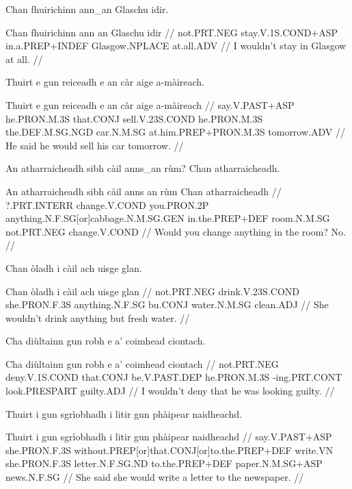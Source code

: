 \documentclass[a4paper,10pt]{article}
\begin{document}
\ex
\begingl
\glpre Chan fhuirichinn ann\_an Glaschu idir. 

\vspace{4mm}
\gla Chan fhuirichinn {ann an} Glaschu idir  //
\glb not.PRT.NEG stay.V.1S.COND+ASP in.a.PREP+INDEF Glasgow.NPLACE at.all.ADV  //
\glft I wouldn't stay in Glasgow at all. //
\endgl
\xe

\ex
\begingl
\glpre Thuirt e gun reiceadh e an càr aige a-màireach. 

\vspace{4mm}
\gla Thuirt e gun reiceadh e an càr aige a-màireach  //
\glb say.V.PAST+ASP he.PRON.M.3S that.CONJ sell.V.23S.COND he.PRON.M.3S the.DEF.M.SG.NGD car.N.M.SG at.him.PREP+PRON.M.3S tomorrow.ADV  //
\glft He said he would sell his car tomorrow. //
\endgl
\xe

\ex
\begingl
\glpre An atharraicheadh sibh càil anns\_an rùm? Chan atharraicheadh. 

\vspace{4mm}
\gla An atharraicheadh sibh càil {anns an} rùm Chan atharraicheadh  //
\glb ?.PRT.INTERR change.V.COND you.PRON.2P anything.N.F.SG[or]cabbage.N.M.SG.GEN in.the.PREP+DEF room.N.M.SG not.PRT.NEG change.V.COND  //
\glft Would you change anything in the room? No. //
\endgl
\xe

\ex
\begingl
\glpre Chan òladh i càil ach uisge glan. 

\vspace{4mm}
\gla Chan òladh i càil ach uisge glan  //
\glb not.PRT.NEG drink.V.23S.COND she.PRON.F.3S anything.N.F.SG bu.CONJ water.N.M.SG clean.ADJ  //
\glft She wouldn't drink anything but fresh water. //
\endgl
\xe

\ex
\begingl
\glpre Cha diùltainn gun robh e a' coimhead ciontach. 

\vspace{4mm}
\gla Cha diùltainn gun robh e a' coimhead ciontach  //
\glb not.PRT.NEG deny.V.1S.COND that.CONJ be.V.PAST.DEP he.PRON.M.3S -ing.PRT.CONT look.PRESPART guilty.ADJ  //
\glft I wouldn't deny that he was looking guilty. //
\endgl
\xe

\ex
\begingl
\glpre Thuirt i gun sgrìobhadh i litir gun phàipear naidheachd. 

\vspace{4mm}
\gla Thuirt i gun sgrìobhadh i litir gun phàipear naidheachd  //
\glb say.V.PAST+ASP she.PRON.F.3S without.PREP[or]that.CONJ[or]to.the.PREP+DEF write.VN she.PRON.F.3S letter.N.F.SG.ND to.the.PREP+DEF paper.N.M.SG+ASP news.N.F.SG  //
\glft She said she would write a letter to the newspaper. //
\endgl
\xe
\end{document}
